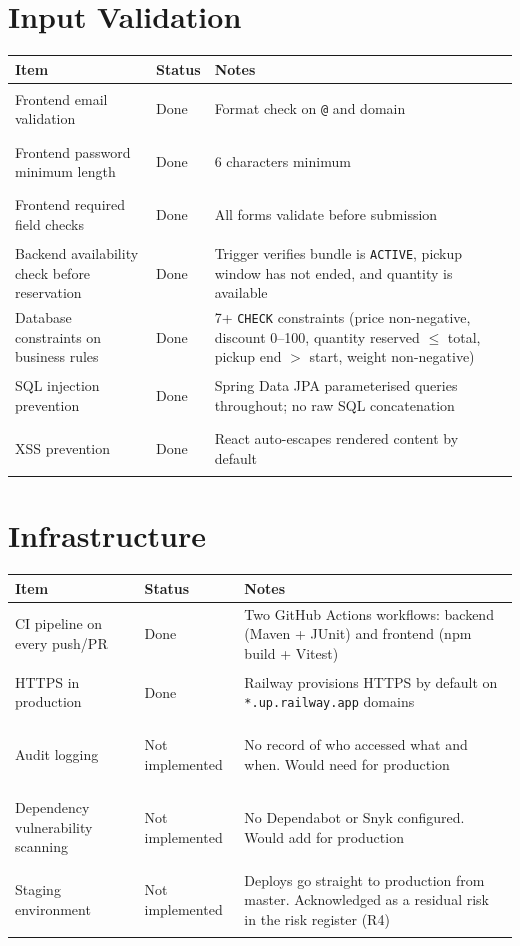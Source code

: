 \documentclass[]{report}
\newcommand{\done}{\colorbox{done}{\strut Done}}
\newcommand{\notimpl}{\colorbox{notdone}{\strut Not implemented}}
\begin{document}
\section*{Input Validation}

\begin{longtable}{|p{4.5cm}|p{2.5cm}|p{7cm}|}
\hline
\textbf{Item} & \textbf{Status} & \textbf{Notes} \\
\hline
Frontend email validation & \done & Format check on \texttt{@} and domain \\
\hline
Frontend password minimum length & \done & 6 characters minimum \\
\hline
Frontend required field checks & \done & All forms validate before submission \\
\hline
Backend availability check before reservation & \done & Trigger verifies bundle is \texttt{ACTIVE}, pickup window has not ended, and quantity is available \\
\hline
Database constraints on business rules & \done & 7+ \texttt{CHECK} constraints (price non-negative, discount 0--100, quantity reserved $\leq$ total, pickup end $>$ start, weight non-negative) \\
\hline
SQL injection prevention & \done & Spring Data JPA parameterised queries throughout; no raw SQL concatenation \\
\hline
XSS prevention & \done & React auto-escapes rendered content by default \\
\hline
\end{longtable}

\section*{Infrastructure}

\begin{longtable}{|p{4.5cm}|p{2.5cm}|p{7cm}|}
\hline
\textbf{Item} & \textbf{Status} & \textbf{Notes} \\
\hline
CI pipeline on every push/PR & \done & Two GitHub Actions workflows: backend (Maven + JUnit) and frontend (npm build + Vitest) \\
\hline
HTTPS in production & \done & Railway provisions HTTPS by default on \texttt{*.up.railway.app} domains \\
\hline
Audit logging & \notimpl & No record of who accessed what and when. Would need for production \\
\hline
Dependency vulnerability scanning & \notimpl & No Dependabot or Snyk configured. Would add for production \\
\hline
Staging environment & \notimpl & Deploys go straight to production from master. Acknowledged as a residual risk in the risk register (R4) \\
\hline
\end{longtable}
\end{document}
